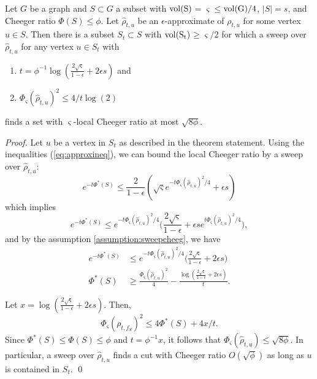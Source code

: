 \documentclass[runningheads,a4paper]{llncs}
\newcommand{\localcheeg}{\Phi^*(S)}
\newcommand{\tparamcluster}{\phi^{-1}\log(\frac{2\sqrt{\varsigma}}{1-\epsilon} + 2\epsilon s)}
\begin{document}
\begin{theorem}\label{thm:main}
Let $G$ be a graph and $S\subset G$ a subset with $\rm{vol}(S)$$= \varsigma
\leq$$\rm{vol}(G)/4$, $|S|=s$, and Cheeger ratio $\Phi(S) \leq \phi$.  Let
$\hat{\rho}_{t,u}$ be an $\epsilon$-approximate of $\rho_{t,u}$ for some vertex $u\in S$.
Then there is a subset $S_t\subset S$ with $\rm{vol}(S_t)$$\geq\varsigma/2$ for
which a sweep over $\hat{\rho}_{t,u}$ for any vertex $u\in S_t$ with
\begin{enumerate}
\item$t=\tparamcluster$ and
\item$\Phi_{\varsigma}(\hat{\rho}_{t,u})^2 \leq 4/t\log(2)$\label{assumption:sweepcheeg}
\end{enumerate}
finds a set with $\varsigma$-local Cheeger ratio at most $\sqrt{8\phi}$.
\end{theorem}

\begin{proof}
Let $u$ be a vertex in $S_t$ as described in the theorem statement.  Using the
inequalities (\ref{eq:approxineq}), we can bound the local Cheeger ratio by a
sweep over $\hat{\rho}_{t,u}$:
\begin{equation*}
e^{-t\localcheeg} \leq \frac{2}{1-\epsilon}(\sqrt{\varsigma}e^{-t\Phi_{\varsigma}(\hat{\rho}_{t,u})^2/4}+\epsilon s)
\end{equation*}
which implies
\begin{equation*}
e^{-t\localcheeg} \leq e^{-t\Phi_{\varsigma}(\hat{\rho}_{t,u})^2/4} \Big(\frac{2\sqrt{\varsigma}}{1-\epsilon} + \epsilon s e^{t\Phi_{\varsigma}(\hat{\rho}_{t,u})^2/4}\Big),
\end{equation*}
and by the assumption \ref{assumption:sweepcheeg}, we have
\begin{align*}
e^{-t\localcheeg} &\leq e^{-t\Phi_{\varsigma}(\hat{\rho}_{t,u})^2/4} \Big(\frac{2\sqrt{\varsigma}}{1-\epsilon} + 2\epsilon s\Big)\\
\localcheeg &\geq \frac{\Phi_{\varsigma}(\hat{\rho}_{t,u})^2}{4} - \frac{\log(\frac{2\sqrt{\varsigma}}{1-\epsilon} + 2\epsilon s)}{t}.
\end{align*}

Let $x=\log(\frac{2\sqrt{\varsigma}}{1-\epsilon} + 2\epsilon s)$.
Then, 
\begin{equation*}
\Phi_{\varsigma}(\rho_{t,f_S})^2 \leq 4\localcheeg + 4x/t.
\end{equation*}
Since $\localcheeg \leq \Phi(S) \leq \phi$ and $t = \phi^{-1}x$, it follows that
$\Phi_{\varsigma}(\hat{\rho}_{t,u}) \leq \sqrt{8\phi}$.  In particular, a sweep over
$\hat{\rho}_{t,u}$ finds a cut with Cheeger ratio $O(\sqrt{\phi})$ as long as $u$ is
contained in $S_t$.
\qed\end{proof}
\end{document}
